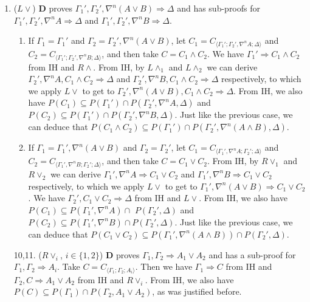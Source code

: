 \begin{enumerate}
	\item ($L\lor$) $\mathbf{D}$ proves $\Gamma_1' , \Gamma_2' , \nabla^n (A \lor B) \Rightarrow \Delta$ and has sub-proofs for $\Gamma_1' , \Gamma_2' , \nabla^n A \Rightarrow \Delta$ and $\Gamma_1' , \Gamma_2' , \nabla^n B \Rightarrow \Delta$.
	\begin{enumerate}
		\item If $\Gamma_1 = \Gamma_1'$ and $\Gamma_2 = \Gamma_2' , \nabla^n (A \lor B)$, let $C_1 = C_{\langle\Gamma_1';\Gamma_2',\nabla^n A;\Delta\rangle}$ and $C_2 = C_{\langle\Gamma_1';\Gamma_2',\nabla^n B;\Delta\rangle}$, and then take $C = C_1 \land C_2$.
		We have $\Gamma_1' \Rightarrow C_1 \land C_2$ from IH and $R\land$.
		From IH, by $L\land_1$ and $L\land_2$ we can derive $\Gamma_2' , \nabla^n A , C_1 \land C_2 \Rightarrow \Delta$ and $\Gamma_2' , \nabla^n B , C_1 \land C_2 \Rightarrow \Delta$ respectively, to which we apply $L\lor$ to get to $\Gamma_2' , \nabla^n (A \lor B) , C_1 \land C_2 \Rightarrow \Delta$.
		From IH, we also have $P(C_1) \subseteq P(\Gamma_1') \cap P(\Gamma_2' , \nabla^n A , \Delta)$ and $P(C_2) \subseteq P(\Gamma_1') \cap P(\Gamma_2' , \nabla^n B , \Delta)$. Just like the previous case, we can deduce that $P(C_1 \land C_2) \subseteq P(\Gamma_1') \cap P(\Gamma_2' , \nabla^n (A \land B) , \Delta)$.

		\item If $\Gamma_1 = \Gamma_1' , \nabla^n (A \lor B)$ and $\Gamma_2 = \Gamma_2'$, let $C_1 = C_{\langle\Gamma_1',\nabla^n A;\Gamma_2';\Delta\rangle}$ and $C_2 = C_{\langle\Gamma_1',\nabla^n B;\Gamma_2';\Delta\rangle}$, and then take $C = C_1 \lor C_2$.
		From IH, by $R\lor_1$ and $R\lor_2$ we can derive $\Gamma_1' , \nabla^n A \Rightarrow C_1 \lor C_2$ and $\Gamma_1' , \nabla^n B \Rightarrow C_1 \lor C_2$ respectively, to which we apply $L\lor$ to get to $\Gamma_1' , \nabla^n (A \lor B) \Rightarrow C_1 \lor C_2$.
		We have $\Gamma_2' , C_1 \lor C_2 \Rightarrow \Delta$ from IH and $L\lor$.
		From IH, we also have $P(C_1) \subseteq P(\Gamma_1' , \nabla^n A) \cap$ $P(\Gamma_2' , \Delta)$ and $P(C_2) \subseteq P(\Gamma_1' , \nabla^n B) \cap P(\Gamma_2' , \Delta)$. Just like the previous case, we can deduce that $P(C_1 \lor C_2) \subseteq P(\Gamma_1' , \nabla^n (A \land B)) \cap P(\Gamma_2' , \Delta)$.
	\end{enumerate}

	\item[10,11.] ($R\lor_i$, {\small$i \in \{1,2\}$}) $\mathbf{D}$ proves $\Gamma_1 , \Gamma_2 \Rightarrow A_1 \lor A_2$ and has a sub-proof for $\Gamma_1 , \Gamma_2 \Rightarrow A_i$. Take $C = C_{\langle\Gamma_1;\Gamma_2;A_i\rangle}$. Then we have $\Gamma_1 \Rightarrow C$ from IH and $\Gamma_2 , C \Rightarrow A_1 \lor A_2$ from IH and $R\lor_i$.
	From IH, we also have $P(C) \subseteq P(\Gamma_1) \cap P(\Gamma_2 , A_1 \lor A_2)$, as was justified before.
	\setcounter{enumi}{11}
	

\end{enumerate}
